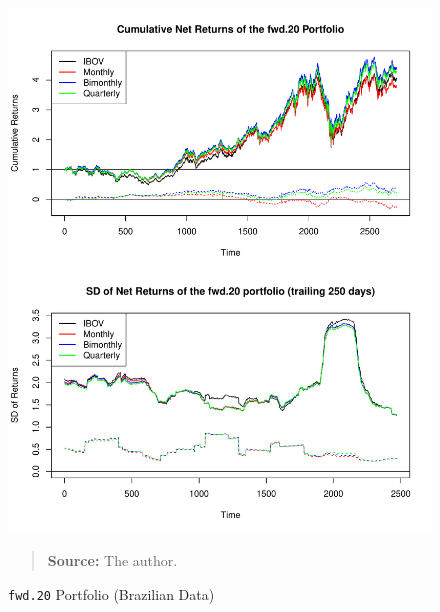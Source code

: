 \documentclass[preprint, doubleblind, authoryear,10pt]{elsarticle}
\begin{document}
\begin{figure}[htpb]
\centering
\footnotesize
\caption{\texttt{fwd.20} Portfolio (Brazilian Data)}
\label{fig:ibov:fwd.20}
\includegraphics[width=.95\linewidth]{./figs/IBOV-retac-fwd-20.pdf}
\begin{quote}
\textbf{Source:} The author.
\end{quote}
\end{figure}
\end{document}
